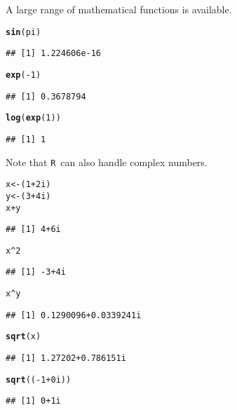 \documentclass[12pt,A4,makeidx]{article}\usepackage[]{graphicx}\usepackage[]{xcolor}
\makeatletter
\newcommand{\hlnum}[1]{\textcolor[rgb]{0.686,0.059,0.569}{#1}}%
\newcommand{\hlopt}[1]{\textcolor[rgb]{0,0,0}{#1}}%
\newcommand{\hlstd}[1]{\textcolor[rgb]{0.345,0.345,0.345}{#1}}%
\newcommand{\hlkwb}[1]{\textcolor[rgb]{0.69,0.353,0.396}{#1}}%
\newcommand{\hlkwd}[1]{\textcolor[rgb]{0.737,0.353,0.396}{\textbf{#1}}}%
\newenvironment{kframe}{%
 \def\at@end@of@kframe{}%
 \ifinner\ifhmode%
  \def\at@end@of@kframe{\end{minipage}}%
  \begin{minipage}{\columnwidth}%
 \fi\fi%
 \def\FrameCommand##1{\hskip\@totalleftmargin \hskip-\fboxsep
 \colorbox{shadecolor}{##1}\hskip-\fboxsep
     \hskip-\linewidth \hskip-\@totalleftmargin \hskip\columnwidth}%
 \MakeFramed {\advance\hsize-\width
   \@totalleftmargin\z@ \linewidth\hsize
   \@setminipage}}%
 {\par\unskip\endMakeFramed%
 \at@end@of@kframe}
\newenvironment{knitrout}{}{} %
\newcommand{\tR}{\texttt{R}}
\makeatother
\begin{document}
A large range of mathematical functions is available.
\begin{knitrout}
\color{fgcolor}\begin{kframe}
\begin{alltt}
\hlkwd{sin}\hlstd{(pi)}
\end{alltt}
\begin{verbatim}
## [1] 1.224606e-16
\end{verbatim}
\begin{alltt}
\hlkwd{exp}\hlstd{(}\hlopt{-}\hlnum{1}\hlstd{)}
\end{alltt}
\begin{verbatim}
## [1] 0.3678794
\end{verbatim}
\begin{alltt}
\hlkwd{log}\hlstd{(}\hlkwd{exp}\hlstd{(}\hlnum{1}\hlstd{))}
\end{alltt}
\begin{verbatim}
## [1] 1
\end{verbatim}
\end{kframe}
\end{knitrout}

Note that \tR \ can also handle complex numbers.
\begin{knitrout}
\color{fgcolor}\begin{kframe}
\begin{alltt}
\hlstd{x}\hlkwb{<-}\hlstd{(}\hlnum{1}\hlopt{+}\hlnum{2i}\hlstd{)}
\hlstd{y}\hlkwb{<-}\hlstd{(}\hlnum{3}\hlopt{+}\hlnum{4i}\hlstd{)}
\hlstd{x}\hlopt{+}\hlstd{y}
\end{alltt}
\begin{verbatim}
## [1] 4+6i
\end{verbatim}
\begin{alltt}
\hlstd{x}\hlopt{^}\hlnum{2}
\end{alltt}
\begin{verbatim}
## [1] -3+4i
\end{verbatim}
\begin{alltt}
\hlstd{x}\hlopt{^}\hlstd{y}
\end{alltt}
\begin{verbatim}
## [1] 0.1290096+0.0339241i
\end{verbatim}
\begin{alltt}
\hlkwd{sqrt}\hlstd{(x)}
\end{alltt}
\begin{verbatim}
## [1] 1.27202+0.786151i
\end{verbatim}
\begin{alltt}
\hlkwd{sqrt}\hlstd{((}\hlopt{-}\hlnum{1}\hlopt{+}\hlnum{0i}\hlstd{))}
\end{alltt}
\begin{verbatim}
## [1] 0+1i
\end{verbatim}
\end{kframe}
\end{knitrout}
\end{document}
